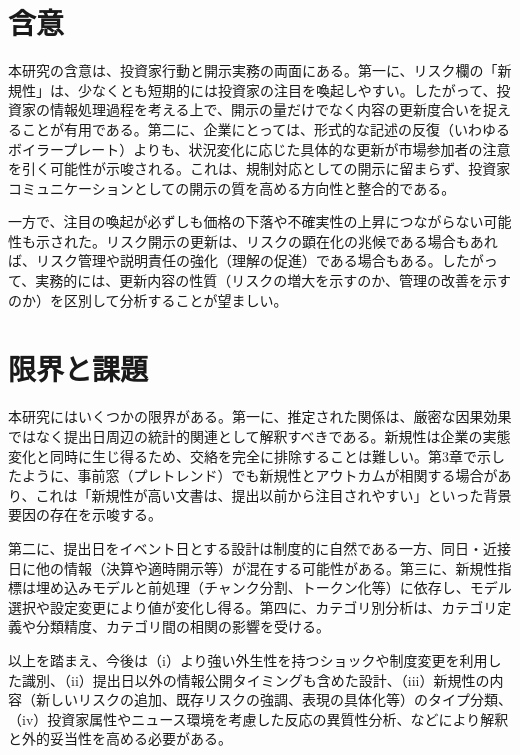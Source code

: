 \section{含意}
本研究の含意は、投資家行動と開示実務の両面にある。第一に、リスク欄の「新規性」は、少なくとも短期的には投資家の注目を喚起しやすい。したがって、投資家の情報処理過程を考える上で、開示の量だけでなく内容の更新度合いを捉えることが有用である。第二に、企業にとっては、形式的な記述の反復（いわゆるボイラープレート）よりも、状況変化に応じた具体的な更新が市場参加者の注意を引く可能性が示唆される。これは、規制対応としての開示に留まらず、投資家コミュニケーションとしての開示の質を高める方向性と整合的である。

一方で、注目の喚起が必ずしも価格の下落や不確実性の上昇につながらない可能性も示された。リスク開示の更新は、リスクの顕在化の兆候である場合もあれば、リスク管理や説明責任の強化（理解の促進）である場合もある。したがって、実務的には、更新内容の性質（リスクの増大を示すのか、管理の改善を示すのか）を区別して分析することが望ましい。

\section{限界と課題}
本研究にはいくつかの限界がある。第一に、推定された関係は、厳密な因果効果ではなく提出日周辺の統計的関連として解釈すべきである。新規性は企業の実態変化と同時に生じ得るため、交絡を完全に排除することは難しい。第3章で示したように、事前窓（プレトレンド）でも新規性とアウトカムが相関する場合があり、これは「新規性が高い文書は、提出以前から注目されやすい」といった背景要因の存在を示唆する。

第二に、提出日をイベント日とする設計は制度的に自然である一方、同日・近接日に他の情報（決算や適時開示等）が混在する可能性がある。第三に、新規性指標は埋め込みモデルと前処理（チャンク分割、トークン化等）に依存し、モデル選択や設定変更により値が変化し得る。第四に、カテゴリ別分析は、カテゴリ定義や分類精度、カテゴリ間の相関の影響を受ける。

以上を踏まえ、今後は（i）より強い外生性を持つショックや制度変更を利用した識別、（ii）提出日以外の情報公開タイミングも含めた設計、（iii）新規性の内容（新しいリスクの追加、既存リスクの強調、表現の具体化等）のタイプ分類、（iv）投資家属性やニュース環境を考慮した反応の異質性分析、などにより解釈と外的妥当性を高める必要がある。


